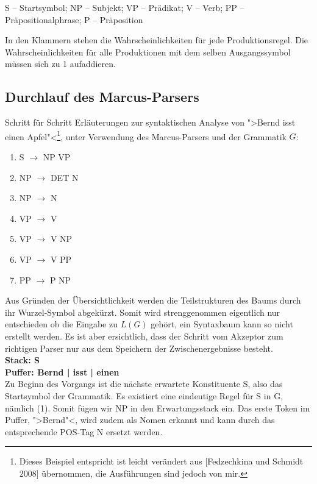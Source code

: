 \documentclass[12pt,a4paper]{article}
\theoremstyle{definition}
\begin{document}
		S – Startsymbol; NP – Subjekt; VP – Prädikat; V – Verb; PP – Präpositionalphrase; P – Präposition
		
		In den Klammern stehen die Wahrscheinlichkeiten für jede Produktionsregel. Die Wahrscheinlichkeiten für alle Produktionen mit dem selben Ausgangssymbol müssen sich zu 1 aufaddieren.

	\subsection{Durchlauf des Marcus-Parsers}
		Schritt für Schritt Erläuterungen zur syntaktischen Analyse von ">Bernd isst einen Apfel"<\footnote{Dieses Beispiel entspricht ist leicht verändert aus [Fedzechkina und Schmidt 2008] übernommen, die Ausführungen sind jedoch von mir.}, unter Verwendung des Marcus-Parsers
		und der Grammatik $G$:
		
		\begin{enumerate}[label={(\arabic*)}]
			\item{S $\rightarrow$ NP VP}
			\item{NP $\rightarrow$ DET N}
			\item{NP $\rightarrow$ N}
			\item{VP $\rightarrow$ V}
			\item{VP $\rightarrow$ V NP}
			\item{VP $\rightarrow$ V PP}
			\item{PP $\rightarrow$ P NP}
		\end{enumerate}
		
		Aus Gründen der Übersichtlichkeit werden die Teilstrukturen des Baums durch ihr Wurzel-Symbol abgekürzt.
		Somit wird strenggenommen eigentlich nur entschieden ob die Eingabe zu $L(G)$ gehört, ein Syntaxbaum kann so nicht erstellt werden. Es ist aber ersichtlich, dass der Schritt vom Akzeptor zum richtigen Parser nur aus dem Speichern der Zwischenergebnisse besteht.\\

		\textbf{Stack: S\\
				Puffer: Bernd | isst | einen\\
		}
		Zu Beginn des Vorgangs ist die nächste erwartete Konstituente S, also das Startsymbol der Grammatik.
		Es existiert eine eindeutige Regel für S in G, nämlich (1). Somit fügen wir NP in den Erwartungsstack ein.
		Das erste Token im Puffer, ">Bernd"<, wird zudem als Nomen erkannt und kann durch das entsprechende POS-Tag N ersetzt werden.\\
		
\end{document}

